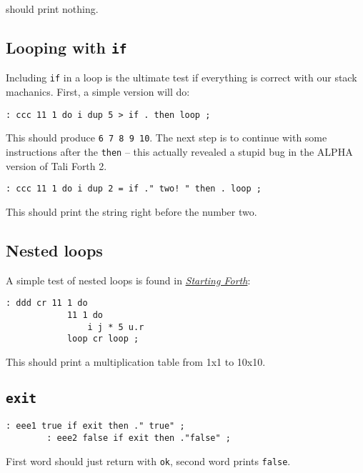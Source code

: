 \noindent should print nothing.


\subsection{Looping with \texttt{if}}

Including \texttt{if} in a loop is the ultimate test if everything is correct
with our stack machanics. First, a simple version will do:

\begin{lstlisting}[frame=lines]
        : ccc 11 1 do i dup 5 > if . then loop ; 
\end{lstlisting}

\noindent This should produce \texttt{6 7 8 9 10}. The next step is to continue
with some instructions after the \texttt{then} -- this actually revealed a
stupid bug in the ALPHA version of Tali Forth 2.

\begin{lstlisting}[frame=lines]
        : ccc 11 1 do i dup 2 = if ." two! " then . loop ;
\end{lstlisting}

\noindent This should print the string right before the number two.

\subsection{Nested loops}

\noindent A simple test of nested loops is found in
\href{https://www.forth.com/starting-forth/6-forth-do-loops/}{\textit{Starting
Forth}}:

\begin{lstlisting}[frame=lines]
        : ddd cr 11 1 do
            11 1 do 
                i j * 5 u.r 
            loop cr loop ;
\end{lstlisting}

\noindent This should print a multiplication table from 1x1 to 10x10.

\subsection{\texttt{exit}}

\begin{lstlisting}[frame=lines]
        : eee1 true if exit then ." true" ; 
        : eee2 false if exit then ."false" ; 
\end{lstlisting}

\noindent First word should just return with \texttt{ok}, second word prints \texttt{false}.


